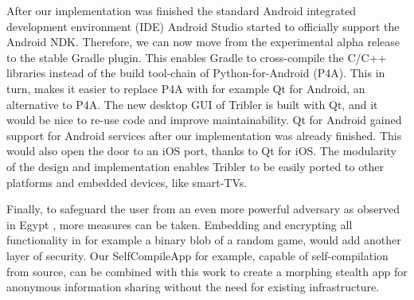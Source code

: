 
After our implementation was finished the standard Android integrated development environment (IDE) Android Studio started to officially support the Android NDK.
Therefore, we can now move from the experimental alpha release to the stable Gradle plugin.
This enables Gradle to cross-compile the C/C++ libraries instead of the build tool-chain of Python-for-Android (P4A).
This in turn, makes it easier to replace P4A with for example Qt for Android, an alternative to P4A.
The new desktop GUI of Tribler is built with Qt, and it would be nice to re-use code and improve maintainability.
Qt for Android gained support for Android services after our implementation was already finished.
This would also open the door to an iOS port, thanks to Qt for iOS.
The modularity of the design and implementation enables Tribler to be easily ported to other platforms and embedded devices, like smart-TVs.

Finally, to safeguard the user from an even more powerful adversary as observed in Egypt \cite{egypt_show_your_facebook_airport}, more measures can be taken.
Embedding and encrypting all functionality in for example a binary blob of a random game, would add another layer of security.
Our SelfCompileApp for example, capable of self-compilation from source, can be combined with this work to create a morphing stealth app for anonymous information sharing without the need for existing infrastructure.

